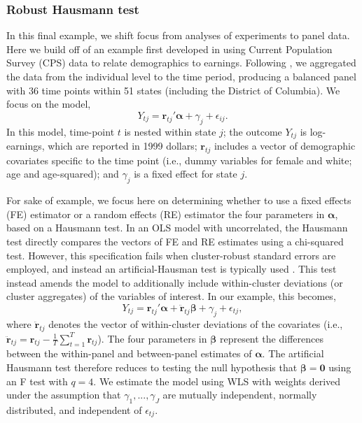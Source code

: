 \documentclass[12pt]{article}\usepackage[]{graphicx}\usepackage[]{color}
\newcommand{\bm}{\mathbf}
\newcommand{\bs}{\boldsymbol}
\begin{document}
\subsubsection{Robust Hausmann test} 

In this final example, we shift focus from analyses of experiments to panel data. Here we build off of an example first developed in \citet{Bertrand2004how} using Current Population Survey (CPS) data to relate demographics to earnings. Following \citet{Cameron2015practitioners}, we aggregated the data from the individual level to the time period, producing a balanced panel with 36 time points within 51 states (including the District of Columbia). We focus on the model,
\begin{equation}
Y_{tj} = \bm{r}_{tj}'\bs\alpha + \gamma_j + \epsilon_{ij}.
\end{equation}
In this model, time-point $t$ is nested within state $j$; the outcome $Y_{tj}$ is log-earnings, which are reported in 1999 dollars; $\bm{r}_{tj}$ includes a vector of demographic covariates specific to the time point (i.e., dummy variables for female and white; age and age-squared); and $\gamma_j$ is a fixed effect for state $j$. 

For sake of example, we focus here on determining whether to use a fixed effects (FE) estimator or a random effects (RE) estimator the four parameters in $\bs\alpha$, based on a Hausmann test. In an OLS model with uncorrelated, the Hausmann test directly compares the vectors of FE and RE estimates using a chi-squared test. However, this specification fails when cluster-robust standard errors are employed, and instead an artificial-Hausman test \citep{Arellano1993on} is typically used \citep[pp. 290-291]{Wooldridge2002econometric}. This test instead amends the model to additionally include within-cluster deviations (or cluster aggregates) of the variables of interest. In our example, this becomes,
\begin{equation}
Y_{tj} = \bm{r}_{tj}'\bs\alpha + \bm{\ddot{r}}_{tj}\bs\beta + \gamma_j + \epsilon_{tj},
\end{equation}
where $\bm{\ddot{r}}_{tj}$ denotes the vector of within-cluster deviations of the covariates (i.e., $\bm{\ddot{r}}_{tj} = \bm{r}_{tj} - \frac{1}{T}\sum_{t=1}^T \bm{r}_{tj}$).
The four parameters in $\bs\beta$ represent the differences between the within-panel and between-panel estimates of $\bs\alpha$. The artificial Hausmann test therefore reduces to testing the null hypothesis that $\bs\beta = \bm{0}$ using an F test with $q = 4$. We estimate the model using WLS with weights derived under the assumption that  $\gamma_1,...,\gamma_J$ are mutually independent, normally distributed, and independent of $\epsilon_{tj}$.
\end{document}
